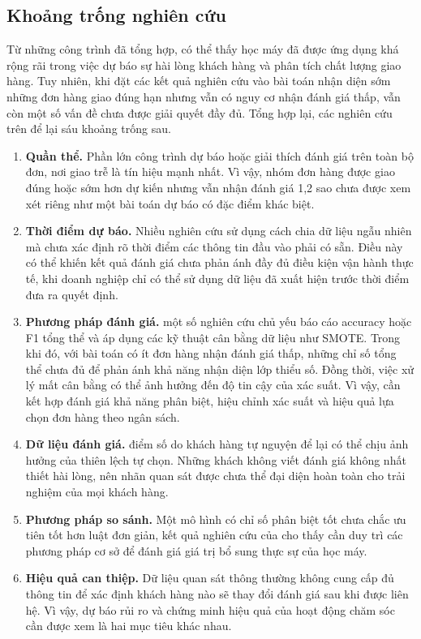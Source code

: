 \documentclass[12pt,a4paper]{report}
\begin{document}
\subsection{Khoảng trống nghiên cứu}\label{sec:rel-gaps}

Từ những công trình đã tổng hợp, có thể thấy học máy đã được ứng dụng khá rộng rãi trong việc dự báo sự hài lòng khách hàng và phân tích chất lượng giao hàng. Tuy nhiên, khi đặt các kết quả nghiên cứu vào bài toán nhận diện sớm những đơn hàng giao đúng hạn nhưng vẫn có nguy cơ nhận đánh giá thấp, vẫn còn một số vấn đề chưa được giải quyết đầy đủ. Tổng hợp lại, các nghiên cứu trên để lại sáu khoảng trống sau.
\begin{enumerate}
  \item \textbf{Quần thể.} Phần lớn công trình dự báo hoặc giải thích đánh giá trên toàn bộ đơn, nơi giao trễ là tín hiệu mạnh nhất. Vì vậy, nhóm đơn hàng được giao đúng hoặc sớm hơn dự kiến nhưng vẫn nhận đánh giá 1,2 sao chưa được xem xét riêng như một bài toán dự báo có đặc điểm khác biệt.
  \item \textbf{Thời điểm dự báo.} Nhiều nghiên cứu sử dụng cách chia dữ liệu ngẫu nhiên mà chưa xác định rõ thời điểm các thông tin đầu vào phải có sẵn. Điều này có thể khiến kết quả đánh giá chưa phản ánh đầy đủ điều kiện vận hành thực tế, khi doanh nghiệp chỉ có thể sử dụng dữ liệu đã xuất hiện trước thời điểm đưa ra quyết định.
  \item \textbf{Phương pháp đánh giá.} một số nghiên cứu chủ yếu báo cáo accuracy hoặc F1 tổng thể và áp dụng các kỹ thuật cân bằng dữ liệu như SMOTE. Trong khi đó, với bài toán có ít đơn hàng nhận đánh giá thấp, những chỉ số tổng thể chưa đủ để phản ánh khả năng nhận diện lớp thiểu số. Đồng thời, việc xử lý mất cân bằng có thể ảnh hưởng đến độ tin cậy của xác suất. Vì vậy, cần kết hợp đánh giá khả năng phân biệt, hiệu chỉnh xác suất và hiệu quả lựa chọn đơn hàng theo ngân sách.
  \item \textbf{Dữ liệu đánh giá.} điểm số do khách hàng tự nguyện để lại có thể chịu ảnh hưởng của thiên lệch tự chọn. Những khách không viết đánh giá không nhất thiết hài lòng, nên nhãn quan sát được chưa thể đại diện hoàn toàn cho trải nghiệm của mọi khách hàng.
  \item \textbf{Phương pháp so sánh.} Một mô hình có chỉ số phân biệt tốt chưa chắc ưu tiên tốt hơn luật đơn giản, kết quả nghiên cứu của \textcite{li2026valuesorting} cho thấy cần duy trì các phương pháp cơ sở để đánh giá giá trị bổ sung thực sự của học máy.
  \item \textbf{Hiệu quả can thiệp.} Dữ liệu quan sát thông thường không cung cấp đủ thông tin để xác định khách hàng nào sẽ thay đổi đánh giá sau khi được liên hệ. Vì vậy, dự báo rủi ro và chứng minh hiệu quả của hoạt động chăm sóc cần được xem là hai mục tiêu khác nhau.
\end{enumerate}
\end{document}
